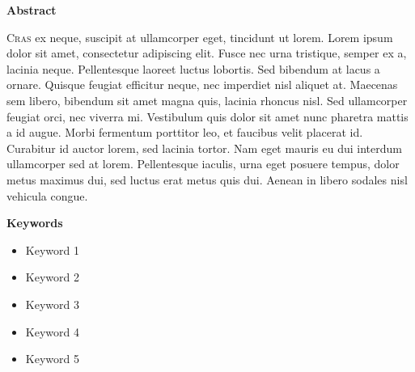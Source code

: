 \thispagestyle{empty}

{\bf\Huge Abstract}

\vspace{1cm}

\lettrine{C}{ras} ex neque, suscipit at ullamcorper eget, tincidunt ut lorem. Lorem ipsum dolor sit amet, consectetur adipiscing elit. Fusce nec urna tristique, semper ex a, lacinia neque. Pellentesque laoreet luctus lobortis. Sed bibendum at lacus a ornare. Quisque feugiat efficitur neque, nec imperdiet nisl aliquet at. Maecenas sem libero, bibendum sit amet magna quis, lacinia rhoncus nisl. Sed ullamcorper feugiat orci, nec viverra mi. Vestibulum quis dolor sit amet nunc pharetra mattis a id augue. Morbi fermentum porttitor leo, et faucibus velit placerat id. Curabitur id auctor lorem, sed lacinia tortor. Nam eget mauris eu dui interdum ullamcorper sed at lorem. Pellentesque iaculis, urna eget posuere tempus, dolor metus maximus dui, sed luctus erat metus quis dui. Aenean in libero sodales nisl vehicula congue.

\vspace{1cm}

{\bf\Huge Keywords}

\vspace{1cm}

\begin{itemize}
    \item Keyword 1
    \item Keyword 2
    \item Keyword 3
    \item Keyword 4
    \item Keyword 5
\end{itemize}